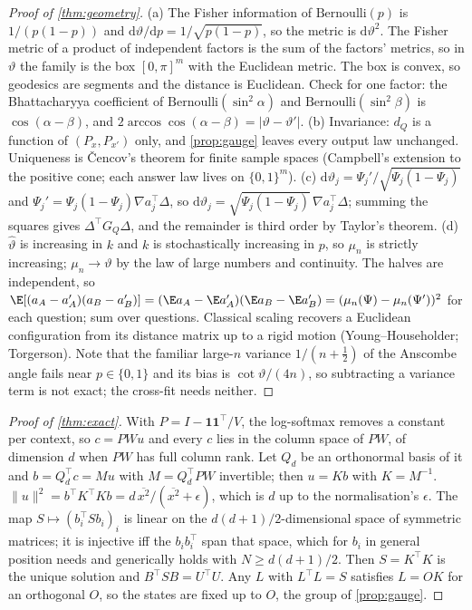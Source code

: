 \begin{proof}[Proof of \cref{thm:geometry}]
(a) The Fisher information of $\mathrm{Bernoulli}(p)$ is $1/(p(1-p))$ and $\mathrm{d}\vartheta/\mathrm{d}p=1/\sqrt{p(1-p)}$, so the metric is $\mathrm{d}\vartheta^2$. The Fisher metric of a product of independent factors is the sum of the factors' metrics, so in $\vartheta$ the family is the box $[0,\pi]^m$ with the Euclidean metric. The box is convex, so geodesics are segments and the distance is Euclidean. Check for one factor: the Bhattacharyya coefficient of $\mathrm{Bernoulli}(\sin^2\alpha)$ and $\mathrm{Bernoulli}(\sin^2\beta)$ is $\cos(\alpha-\beta)$, and $2\arccos\cos(\alpha-\beta)=|\vartheta-\vartheta'|$.
(b) Invariance: $d_Q$ is a function of $(P_x,P_{x'})$ only, and \cref{prop:gauge} leaves every output law unchanged. Uniqueness is \v{C}encov's theorem for finite sample spaces (Campbell's extension to the positive cone; each answer law lives on $\{0,1\}^m$).
(c) $\mathrm{d}\vartheta_j=\Psi_j'/\sqrt{\Psi_j(1-\Psi_j)}$ and $\Psi_j'=\Psi_j(1-\Psi_j)\nabla a_j^{\top}\Delta$, so $\mathrm{d}\vartheta_j=\sqrt{\Psi_j(1-\Psi_j)}\,\nabla a_j^{\top}\Delta$; summing the squares gives $\Delta^{\top}G_Q\Delta$, and the remainder is third order by Taylor's theorem.
(d) $\hat\vartheta$ is increasing in $k$ and $k$ is stochastically increasing in $p$, so $\mu_n$ is strictly increasing; $\mu_n\to\vartheta$ by the law of large numbers and continuity. The halves are independent, so $\E[(a_A-a'_A)(a_B-a'_B)]=(\E a_A-\E a'_A)(\E a_B-\E a'_B)=(\mu_n(\Psi)-\mu_n(\Psi'))^2$ for each question; sum over questions. Classical scaling recovers a Euclidean configuration from its distance matrix up to a rigid motion (Young--Householder; Torgerson). Note that the familiar large-$n$ variance $1/(n+\frac12)$ of the Anscombe angle fails near $p\in\{0,1\}$ and its bias is $\cot\vartheta/(4n)$, so subtracting a variance term is not exact; the cross-fit needs neither.
\end{proof}
\begin{proof}[Proof of \cref{thm:exact}]
With $P=I-\mathbf{1}\mathbf{1}^{\top}/V$, the log-softmax removes a constant per context, so $c=PWu$ and every $c$ lies in the column space of $PW$, of dimension $d$ when $PW$ has full column rank. Let $Q_d$ be an orthonormal basis of it and $b=Q_d^{\top}c=Mu$ with $M=Q_d^{\top}PW$ invertible; then $u=Kb$ with $K=M^{-1}$. $\|u\|^2=b^{\top}K^{\top}Kb=d\,\overline{x^2}/(\overline{x^2}+\epsilon)$, which is $d$ up to the normalisation's $\epsilon$. The map $S\mapsto(b_i^{\top}Sb_i)_i$ is linear on the $d(d+1)/2$-dimensional space of symmetric matrices; it is injective iff the $b_ib_i^{\top}$ span that space, which for $b_i$ in general position needs and generically holds with $N\ge d(d+1)/2$. Then $S=K^{\top}K$ is the unique solution and $B^{\top}SB=U^{\top}U$. Any $L$ with $L^{\top}L=S$ satisfies $L=OK$ for an orthogonal $O$, so the states are fixed up to $O$, the group of \cref{prop:gauge}.
\end{proof}
